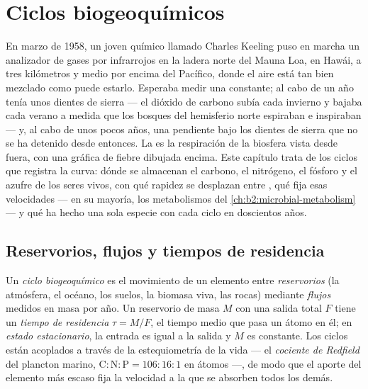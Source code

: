 \chapter{Ciclos biogeoquímicos}\label{ch:b2:biogeochemical-cycles}

En marzo de 1958, un joven químico llamado Charles Keeling puso en marcha
un analizador de gases por infrarrojos en la ladera norte del Mauna Loa,
en Hawái, a tres kilómetros y medio por encima del Pacífico, donde el aire
está tan bien mezclado como puede estarlo. Esperaba medir una constante;
al cabo de un año tenía unos dientes de sierra --- el dióxido de carbono
subía cada invierno y bajaba cada verano a medida que los bosques del
hemisferio norte espiraban e inspiraban --- y, al cabo de unos pocos años,
una pendiente bajo los dientes de sierra que no se ha detenido desde
entonces. La  es la respiración de la biosfera vista desde
fuera, con una gráfica de fiebre dibujada encima. Este capítulo trata de
los ciclos que registra la curva: dónde se almacenan el carbono, el
nitrógeno, el fósforo y el azufre de los seres vivos, con qué rapidez se
desplazan entre , qué fija esas velocidades --- en su mayoría,
los metabolismos del \cref{ch:b2:microbial-metabolism} --- y qué ha hecho
una sola especie con cada ciclo en doscientos años.

\section{Reservorios, flujos y tiempos de residencia}

\begin{definition}\label{def:b2:biogeochemical-cycles:reservoir}
Un \emph{ciclo biogeoquímico} es el movimiento de un elemento entre
\emph{reservorios} (la atmósfera, el océano, los suelos, la biomasa viva,
las rocas) mediante \emph{flujos} medidos en masa por año. Un reservorio
de masa $M$ con una salida total $F$ tiene un \emph{tiempo de
residencia} $\tau = M/F$, el tiempo medio que pasa un átomo en él; en
\emph{estado estacionario}, la entrada es igual a la salida y $M$ es
constante. Los ciclos están acoplados a través de la estequiometría de la
vida --- el \emph{cociente de Redfield} del plancton marino,
$\mathrm{C:N:P} =
106:16:1$ en átomos ---, de modo que el aporte del elemento más escaso
fija la velocidad a la que se absorben todos los demás.
\end{definition}

